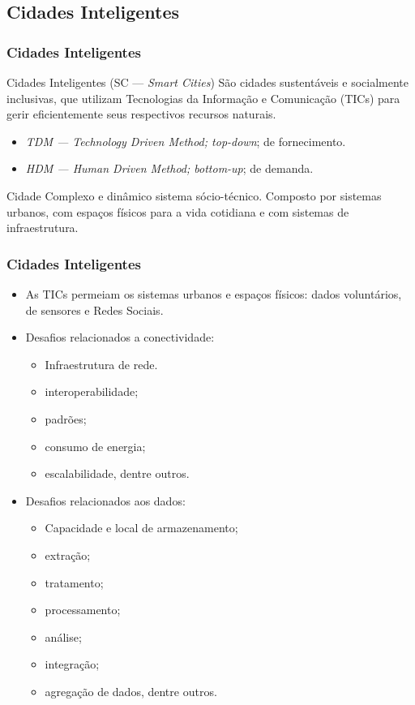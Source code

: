 \documentclass{beamer}
\begin{document}
\subsection{Cidades Inteligentes}
\begin{frame}
\frametitle{Cidades Inteligentes}
\begin{block}{Cidades Inteligentes (SC --- \textit{Smart Cities})}
São cidades sustentáveis e socialmente inclusivas, que utilizam Tecnologias da Informação e Comunicação (TICs) para gerir eficientemente seus respectivos recursos naturais.
\begin{itemize}
\item \textit{TDM --- Technology Driven Method; top-down}; de fornecimento.
\item \textit{HDM --- Human Driven Method; bottom-up}; de demanda.
\end{itemize}
\end{block}

\begin{block}{Cidade}
Complexo e dinâmico sistema sócio-técnico. Composto por sistemas urbanos, com espaços físicos para a vida cotidiana e com sistemas de infraestrutura.
\end{block}
\end{frame}
\begin{frame}
\frametitle{Cidades Inteligentes}
\begin{itemize}
\item As TICs permeiam os sistemas urbanos e espaços físicos: dados voluntários, de sensores e Redes Sociais.
\item Desafios relacionados a conectividade:
\begin{itemize}
\item Infraestrutura de rede.
\item interoperabilidade;
\item padrões;
\item consumo de energia;
\item escalabilidade, dentre outros.
\end{itemize}
\item Desafios relacionados aos dados:
\begin{itemize}
\item Capacidade e local de armazenamento;
\item extração;
\item tratamento;
\item processamento;
\item análise;
\item integração;
\item agregação de dados, dentre outros.
\end{itemize}
\end{itemize}
\end{frame}
\end{document}
